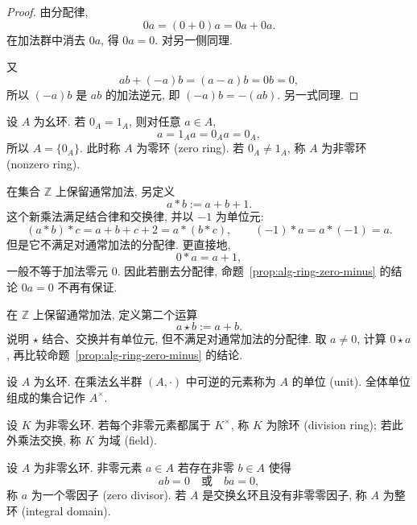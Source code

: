 \documentclass[usesamecnt, thmcnt=section, lang=cn, newtx, 10pt, scheme=chinese]{elegantbook}
\begin{document}
\begin{proof}
由分配律,
\[
 0a=(0+0)a=0a+0a.
\]
在加法群中消去 $0a$, 得 $0a=0$. 对另一侧同理.

又
\[
 ab+(-a)b=(a-a)b=0b=0,
\]
所以 $(-a)b$ 是 $ab$ 的加法逆元, 即 $(-a)b=-(ab)$. 另一式同理.
\end{proof}

\begin{definition}[零环与非零环]\label{def:alg-zero-ring}
设 $A$ 为幺环. 若 $0_A=1_A$, 则对任意 $a\in A$,
\[
 a=1_Aa=0_Aa=0_A,
\]
所以 $A=\{0_A\}$. 此时称 $A$ 为{\color{blue}零环 (zero ring)}. 若 $0_A\neq1_A$, 称 $A$ 为{\color{blue}非零环 (nonzero ring)}.
\end{definition}

\begin{instance}
在集合 $\mathbb Z$ 上保留通常加法, 另定义
\[
 a*b:=a+b+1.
\]
这个新乘法满足结合律和交换律, 并以 $-1$ 为单位元:
\[
 (a*b)*c=a+b+c+2=a*(b*c),
 \qquad
 (-1)*a=a*(-1)=a.
\]
但是它不满足对通常加法的分配律. 更直接地,
\[
 0*a=a+1,
\]
一般不等于加法零元 $0$. 因此若删去分配律, 命题~\ref{prop:alg-ring-zero-minus} 的结论 $0a=0$ 不再有保证.
\end{instance}

\begin{exercise}\label{ex:alg-ring-distributive}
在 $\mathbb Z$ 上保留通常加法, 定义第二个运算
\[
 a\star b:=a+b.
\]
说明 $\star$ 结合、交换并有单位元, 但不满足对通常加法的分配律. 取 $a\neq0$, 计算 $0\star a$, 再比较命题~\ref{prop:alg-ring-zero-minus} 的结论.
\end{exercise}

\begin{definition}[单位]\label{def:alg-unit}
设 $A$ 为幺环. 在乘法幺半群 $(A,\cdot)$ 中可逆的元素称为 $A$ 的{\color{blue}单位 (unit)}. 全体单位组成的集合记作
$A^\times$.

\end{definition}

\begin{definition}[除环与域]\label{def:alg-division-field}
设 $K$ 为非零幺环. 若每个非零元素都属于 $K^\times$, 称 $K$ 为{\color{blue}除环 (division ring)}; 若此外乘法交换, 称 $K$ 为{\color{blue}域 (field)}.
\end{definition}

\begin{definition}[零因子与整环]\label{def:alg-domain-field}
设 $A$ 为非零幺环. 非零元素 $a\in A$ 若存在非零 $b\in A$ 使得
\[
 ab=0
 \quad\text{或}\quad
 ba=0,
\]
称 $a$ 为一个{\color{blue}零因子 (zero divisor)}. 若 $A$ 是交换幺环且没有非零零因子, 称 $A$ 为{\color{blue}整环 (integral domain)}.
\end{definition}
\end{document}
